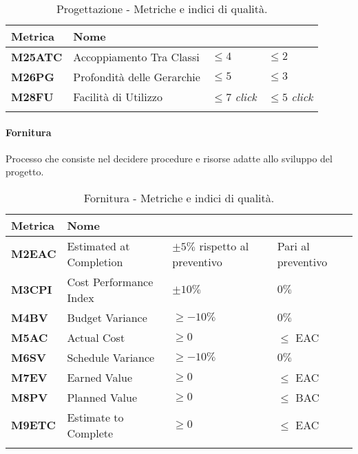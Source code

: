 \hspace{1pt}
    \begin{longtable}{|C{1.5cm}|L{3cm}|L{2.5cm}|L{2.5cm}|}
        \hline
        \textbf{Metrica} & \textbf{Nome} & \textbf{} & \textbf{} \\
        \hline
        \textbf{M25ATC} & Accoppiamento Tra Classi & $\leq 4$  & $\leq 2$ \\
        \hline
        \textbf{M26PG} & Profondità delle Gerarchie & $\leq 5$  & $\leq 3$ \\
        \hline
        \textbf{M28FU} & Facilità di Utilizzo & $\leq 7$ \textit{click}  & $\leq 5$ \textit{click} \\
        \hline
    \caption{Progettazione - Metriche e indici di qualità.}
    \label{tab:progettazione_progetto}
\end{longtable}

\paragraph{Fornitura}
Processo che consiste nel decidere procedure e risorse
adatte allo sviluppo del progetto.

\hspace{1pt}
    \begin{longtable}{|C{1.5cm}|L{3cm}|L{2.5cm}|L{2.5cm}|}
        \hline
        \textbf{Metrica} & \textbf{Nome} & \textbf{} & \textbf{} \\
        \hline
        \textbf{M2EAC} & Estimated at Completion & $\pm 5\%$ rispetto al preventivo & Pari al preventivo \\
        \hline
        \textbf{M3CPI} & Cost Performance Index & $\pm 10\%$ & $0\%$ \\
        \hline
        \textbf{M4BV} & Budget Variance & $\geq -10\%$ & $0\%$ \\
        \hline
        \textbf{M5AC} & Actual Cost & $\geq 0 $ & $ \leq$ EAC  \\
        \hline
        \textbf{M6SV} & Schedule Variance & $\geq -10\%$ & $0\%$ \\
        \hline
        \textbf{M7EV} & Earned Value & $\geq 0 $ & $\leq$ EAC  \\
        \hline
        \textbf{M8PV} & Planned Value & $\geq 0  $ & $ \leq$ BAC  \\
        \hline
        \textbf{M9ETC} & Estimate to Complete & $\geq 0  $ & $ \leq$ EAC  \\
        \hline
    \caption{Fornitura - Metriche e indici di qualità.}
    \label{tab:controllo_progetto}
\end{longtable}

